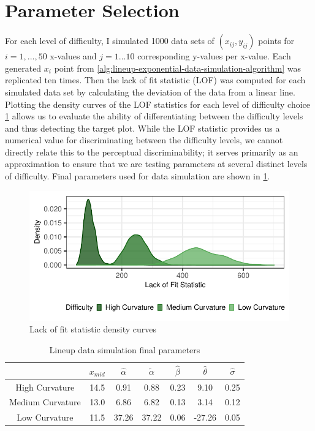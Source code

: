 \documentclass[print]{nuthesis}
\begin{document}
\hypertarget{lineups-parameter-selection}{%
\section{Parameter Selection}\label{lineups-parameter-selection}}

For each level of difficulty, I simulated 1000 data sets of \((x_{ij}, y_{ij})\) points for \(i = 1,...,50\) x-values and \(j = 1...10\) corresponding y-values per x-value.
Each generated \(x_i\) point from \cref{alg:lineup-exponential-data-simulation-algorithm} was replicated ten times.
Then the lack of fit statistic (LOF) was computed for each simulated data set by calculating the deviation of the data from a linear line.
Plotting the density curves of the LOF statistics for each level of difficulty choice \cref{fig:lof-density-curves} allows us to evaluate the ability of differentiating between the difficulty levels and thus detecting the target plot.
While the LOF statistic provides us a numerical value for discriminating between the difficulty levels, we cannot directly relate this to the perceptual discriminability; it serves primarily as an approximation to ensure that we are testing parameters at several distinct levels of difficulty.
Final parameters used for data simulation are shown in \cref{tab:parameter-data}.

\begin{figure}[tbp]

{\centering \includegraphics[width=0.75\linewidth,]{thesis_files/figure-latex/lof-density-curves-1} 

}

\caption{Lack of fit statistic density curves}\label{fig:lof-density-curves}
\end{figure}

\begin{table}

\caption{\label{tab:parameter-data}Lineup data simulation final parameters}
\centering
\begin{tabular}[t]{ccccccc}
\toprule
 & $x_{mid}$ & $\hat\alpha$ & $\tilde\alpha$ & $\hat\beta$ & $\hat\theta$ & $\hat\sigma$\\
\midrule
High Curvature & 14.5 & 0.91 & 0.88 & 0.23 & 9.10 & 0.25\\
Medium Curvature & 13.0 & 6.86 & 6.82 & 0.13 & 3.14 & 0.12\\
Low Curvature & 11.5 & 37.26 & 37.22 & 0.06 & -27.26 & 0.05\\
\bottomrule
\end{tabular}
\end{table}
\end{document}
